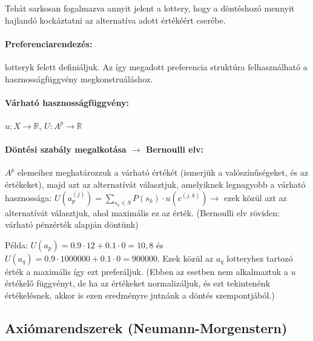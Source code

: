 \documentclass[a4paper,12pt]{article}
\begin{document}
Tehát sarkosan fogalmazva annyit jelent a lottery, hogy a döntéshozó mennyit hajlandó kockáztatni az alternatíva adott értékéért cserébe.

\paragraph{Preferenciarendezés: } lotteryk felett definiáljuk. Az így megadott preferencia struktúra felhasználható a hasznosságfüggvény megkonstruáláshoz. %

\paragraph{Várható hasznosságfüggvény:} $u: X \rightarrow \mathbb{R}$,  $U: A^p \rightarrow \mathbb{R}$


\paragraph{Döntési szabály megalkotása  $\rightarrow$ Bernoulli elv: } $A^p$ elemeihez meghatározzuk a várható értékét (ismerjük a valószínűségeket, és az értékeket), majd azt az alternatívát választjuk, amelyiknek legnagyobb a várható hasznossága: $U(a^{(j)}_p)= \sum_{s_k \in S} P(s_k)\cdot u(c^{(j,k)}) \rightarrow$ ezek közül azt az alternatívát választjuk, ahol maximális ez az érték. (Bernoulli elv röviden: várható pénzérték alapján döntünk)


Példa: $U(a_p)= 0.9\cdot 12 + 0.1\cdot 0 = 10,8$ és $U(a_q)= 0.9\cdot 1000000 + 0.1\cdot 0 = 900000$. Ezek közül az $a_q$ lotteryhez tartozó érték a maximális így ezt preferáljuk. (Ebben az esetben nem alkalmaztuk a $u$ értékelő függvényt, de ha az értékeket normalizáljuk, és ezt tekintenénk értékelésnek, akkor is ezen eredményre jutnánk a döntés szempontjából.)

\subsection{Axiómarendszerek (Neumann-Morgenstern)} 
\end{document}
